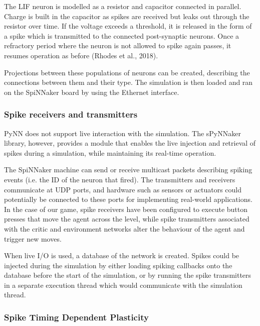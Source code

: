 \documentclass[10pt]{article}
\begin{document}
    The LIF neuron is modelled as a resistor and capacitor connected in parallel. Charge is built in the capacitor as spikes are received but leaks out through the resistor over time. If the voltage exceeds a threshold, it is released in the form of a spike which is transmitted to the connected post-synaptic neurons. Once a refractory period where the neuron is not allowed to spike again passes, it resumes operation as before (Rhodes et al., 2018).
    
    Projections between these populations of neurons can be created, describing the connections between them and their type. The simulation is then loaded and ran on the SpiNNaker board by using the Ethernet interface.

    \subsubsection{Spike receivers and transmitters}

    PyNN does not support live interaction with the simulation. The sPyNNaker library, however, provides a module that enables the live injection and retrieval of spikes during a simulation, while maintaining its real-time operation.

    The SpiNNaker machine can send or receive multicast packets describing spiking events (i.e. the ID of the neuron that fired). The transmitters and receivers communicate at UDP ports, and hardware such as sensors or actuators could potentially be connected to these ports for implementing real-world applications. In the case of our game, spike receivers have been configured to execute button presses that move the agent across the level, while spike transmitters associated with the critic and environment networks alter the behaviour of the agent and trigger new moves.

    When live I/O is used, a database of the network is created. Spikes could be injected during the simulation by either loading spiking callbacks onto the database before the start of the simulation, or by running the spike transmitters in a separate execution thread which would communicate with the simulation thread.

    \subsubsection{Spike Timing Dependent Plasticity}
\end{document}
